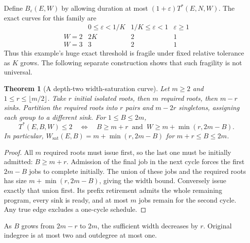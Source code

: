 \documentclass[11pt]{article}
\newtheorem{theorem}{Theorem}
\newcommand{\T}{T^*}
\newcommand{\ws}{W_{\mathrm{sat}}}
\begin{document}
Define $B_\varepsilon(E,W)$ by allowing duration at most
$(1+\varepsilon)\T(E,N,W)$. The exact curves for this family are
\[
\begin{array}{c|ccc}
 &0\le\varepsilon<1/K&1/K\le\varepsilon<1&\varepsilon\ge1\\\hline
 W=2&2K&2&1\\
 W=3&3&2&1
\end{array}
\]
Thus this example's huge exact threshold is fragile under fixed relative
tolerance as $K$ grows. The following separate construction shows that such
fragility is not universal.

\begin{theorem}[A depth-two width-saturation curve]
Let $m\ge2$ and $1\le r\le\lfloor m/2\rfloor$. Take $r$ initial isolated
roots, then $m$ required roots, then $m-r$ sinks. Partition the required
roots into $r$ pairs and $m-2r$ singletons, assigning each group to a
different sink. For $1\le B\le2m$,
\[
 \T(E,B,W)\le2\quad\Longleftrightarrow\quad
 B\ge m+r\ \text{ and }\ W\ge m+\min(r,2m-B).
\]
In particular, $\ws(E,B)=m+\min(r,2m-B)$ for $m+r\le B\le2m$.
\end{theorem}
\begin{proof}
All $m$ required roots must issue first, so the last one must be initially
admitted: $B\ge m+r$. Admission of the final job in the next cycle forces
the first $2m-B$ jobs to complete initially. The union of these jobs and
the required roots has size $m+\min(r,2m-B)$, giving the width bound.
Conversely issue exactly that union first. Its prefix retirement admits
the whole remaining program, every sink is ready, and at most $m$ jobs
remain for the second cycle. Any true edge excludes a one-cycle schedule.
\end{proof}
As $B$ grows from $2m-r$ to $2m$, the sufficient width decreases by $r$.
Original indegree is at most two and outdegree at most one.
\end{document}
